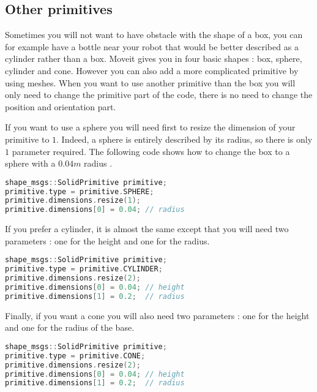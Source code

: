 \subsection{Other primitives}
Sometimes you will not want to have obstacle with the shape of a box, you can for example have a bottle near your robot that would be better described as a cylinder rather than a box. Moveit gives you in four basic shapes : box, sphere, cylinder and cone. However you can also add a more complicated primitive by using meshes. When you want to use another primitive than the box you will only need to change the primitive part of the code, there is no need to change the position and orientation part.

If you want to use a sphere you will need first to resize the dimension of your primitive to $1$. Indeed, a sphere is entirely described by its radius, so there is only $1$ parameter required. The following code shows how to change the box to a sphere with a $0.04m$ radius .

\begin{lstlisting}[language=c++]
shape_msgs::SolidPrimitive primitive;
primitive.type = primitive.SPHERE;
primitive.dimensions.resize(1);
primitive.dimensions[0] = 0.04; // radius
\end{lstlisting}

If you prefer a cylinder, it is almost the same except that you will need two parameters : one for the height and one for the radius.


\begin{lstlisting}[language=c++]
shape_msgs::SolidPrimitive primitive;
primitive.type = primitive.CYLINDER;
primitive.dimensions.resize(2);
primitive.dimensions[0] = 0.04; // height
primitive.dimensions[1] = 0.2;  // radius
\end{lstlisting}

Finally,  if you want a cone you will also need two parameters : one for the height and one for the radius of the base.

\begin{lstlisting}[language=c++]
shape_msgs::SolidPrimitive primitive;
primitive.type = primitive.CONE;
primitive.dimensions.resize(2);
primitive.dimensions[0] = 0.04; // height
primitive.dimensions[1] = 0.2;  // radius
\end{lstlisting}